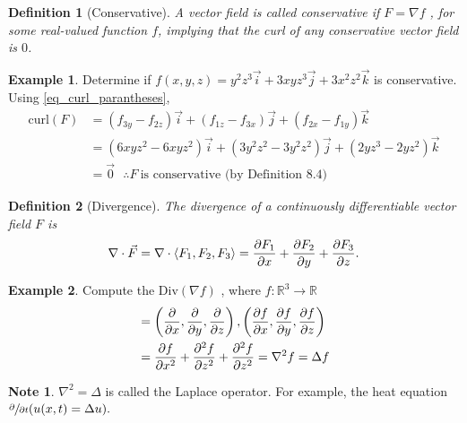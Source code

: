 \documentclass[
	12pt,
	]{article}
\newcommand{\la}{\langle}
\newcommand{\ra}{\rangle}
\newcommand{\R}{\mathbb{R}}
\theoremstyle{custom}
\theoremstyle{custom}
\theoremstyle{custom}
\theoremstyle{custom}
\newtheorem{definition}{Definition}[section]
\theoremstyle{custom}
\theoremstyle{definition}
\newtheorem{example}{Example}[section]
\theoremstyle{example}
\newtheorem*{note}{Note}
\theoremstyle{note}
\theoremstyle{remark}
\theoremstyle{example}
\newcounter{theo}[section]\setcounter{theo}{0}
\numberwithin{equation}{subsection}
\begin{document}
  				\begin{definition}[Conservative]
  					A vector field is called conservative if $F= \nabla f$ , for some real-valued function $f$, implying that the curl of any conservative vector field is $0$.
  				\end{definition}
  				
  				\begin{example}
  					Determine if $f(x,y,z) = y^{2}z^{3}\vec{i} + 3xyz^{3}\vec{j} + 3x^{2}z^{2}\vec{k}$ is conservative. Using \eqref{eq_curl_parantheses}, 
  					\begin{align*}
	  					\text{curl}(F) &= (f_{3y} - f_{2z})\vec{i} + (f_{1z} - f_{3x})\vec{j} + (f_{2x} - f_{1y})\vec{k} \\
	  					&= (6xyz^{2} - 6xyz^{2})\vec{i} + (3y^{2}z^{2} - 3y^{2} z^{2})\vec{j} + (2yz^{3}-2yz^{2})\vec{k} \\
	  					&= \vec{0 }\ \ \ \therefore F \ \text{is conservative  (by Definition 8.4)}
  					\end{align*}
  				\end{example}
  				
  				\begin{definition}[Divergence]
  					The divergence of a continuously differentiable vector field $F$ is
  					 \begin{equation} 
  					  \nabla \cdot \vec{F} = \nabla \cdot \la F_{1} , F_{2} , F_{3} \ra = \pdv{F_{1}}{x} + \pdv{F_{2}}{y} + \pdv{F_{3}}{z}.
  					  \end{equation}
  				\end{definition}
  				
  				\begin{example}
  					Compute the Div$(\nabla f)$ , where $f: \R^{3} \to \R$
  					\begin{align*}
  						&= \left(\pdv{}{x}, \pdv{}{y}, \pdv{}{z}\right) , \left(\pdv{f}{x} , \pdv{f}{y} , \pdv{f}{z}\right) \\
  						&= \pdv{f}{x^{2}} + \pdv[2]{f}{z} + \pdv[2]{f}{z} = \nabla^{2} f = \Delta f
  					\end{align*}
  				\end{example}
  				
  				\begin{note}
  					$\nabla^{2} = \Delta$ is called the Laplace operator. For example, the heat equation ${\sfrac{\partial}{\partial t}(u(x,t) = \Delta u)}.$
  				\end{note}
  				
\end{document}
